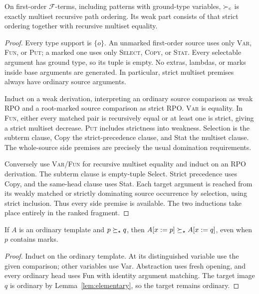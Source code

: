 \begin{theorem}\label{thm:rpo}
On first-order $\mathcal F$-terms, including patterns with ground-type
variables, $\succ_c$ is exactly multiset recursive path ordering. Its weak
part consists of that strict ordering together with recursive multiset
equality.
\end{theorem}
\begin{proof}
Every type support is $\{o\}$. An unmarked first-order source uses only
\textsc{Var}, \textsc{Fun}, or \textsc{Put}; a marked one uses only
\textsc{Select}, \textsc{Copy}, or \textsc{Stat}. Every selectable argument
has ground type, so its tuple is empty. No extras, lambdas, or marks
inside base arguments are generated. In particular, strict multiset
premises always have ordinary source arguments.

Induct on a weak derivation, interpreting an ordinary source comparison
as weak RPO and a root-marked source comparison as strict RPO.
\textsc{Var} is equality. In \textsc{Fun}, either every matched pair
is recursively equal or at least one is strict, giving a strict multiset
decrease. \textsc{Put} includes strictness into weakness. Selection is
the subterm clause, Copy the strict-precedence clause, and Stat the
multiset clause. The whole-source side premises are precisely the usual
domination requirements.

Conversely use \textsc{Var}/\textsc{Fun} for recursive multiset equality
and induct on an RPO derivation. The subterm clause is empty-tuple
Select. Strict precedence uses Copy, and the same-head clause uses Stat.
Each target argument is reached from its weakly matched or strictly
dominating source occurrence by selection, using strict inclusion.
Thus every side premise is available. The two inductions take place
entirely in the ranked fragment.
\end{proof}

\begin{lemma}\label{lem:grafting}
If $A$ is an ordinary template and $p\succeq_\star q$, then
$A[x:=p]\succeq_\star A[x:=q]$, even when $p$ contains marks.
\end{lemma}
\begin{proof}
Induct on the ordinary template. At its distinguished variable use the
given comparison; other variables use Var. Abstraction uses fresh
opening, and every ordinary head uses Fun with identity argument
matching. The target image $q$ is ordinary by
Lemma~\ref{lem:elementary}, so the target remains ordinary.
\end{proof}

